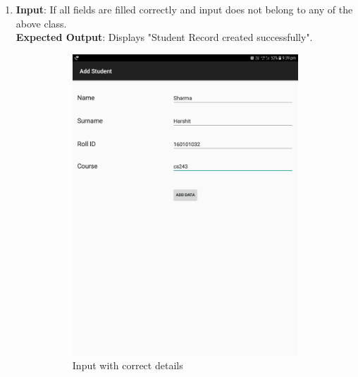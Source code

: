 \documentclass{scrreprt}
\begin{document}
\begin{itemize}
\begin{enumerate}
\newpage
\item \textbf{Input}: If all fields are filled correctly and input does not belong to any of the above class.\\
\textbf{Expected Output}: Displays "Student Record created successfully".
\begin{figure}[H]
\begin{subfigure}{0.5\textwidth}
\includegraphics[width=0.85\linewidth, keepaspectratio]{addok.jpg} 
\caption{Input with correct details}
\label{fig:subim1}
\end{subfigure}
\begin{subfigure}{0.5\textwidth}

\end{subfigure}
\end{figure}
\end{enumerate}
\end{itemize}
\end{document}
